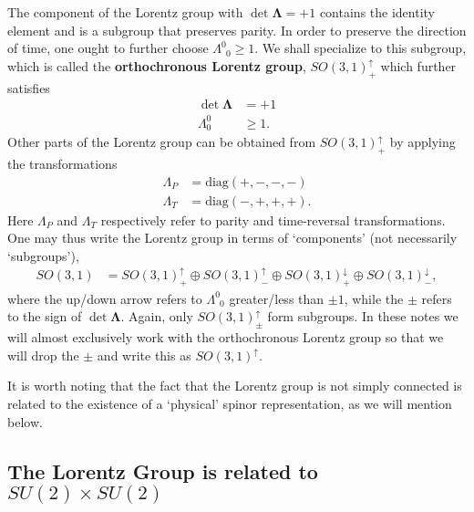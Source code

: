 The component of the Lorentz group with $\det \mathbf\Lambda = +1$ contains the identity element and is a subgroup that preserves parity. In order to preserve the direction of time, one ought to further choose $\Lambda^0_{\phantom{0}0}\geq 1$. We shall specialize to this subgroup, which is called the \textbf{orthochronous Lorentz group}, $SO(3,1)^\uparrow_+$ which further satisfies 
\begin{align}
    \det \mathbf{\Lambda}&= +1\\
    \Lambda^0_0 &\geq 1.
\end{align}
Other parts of the Lorentz group can be obtained from $SO(3,1)^\uparrow_+$ by applying the transformations
\begin{align}
    \Lambda_P &= \text{diag}(+,-,-,-)\\
    \Lambda_T &= \text{diag}(-,+,+,+).
\end{align}
Here $\Lambda_P$ and $\Lambda_T$ respectively refer to parity and time-reversal transformations. One may thus write the Lorentz group in terms of `components' (not necessarily `subgroups'),
\begin{align}
    SO(3,1) &= SO(3,1)^\uparrow_+ \oplus SO(3,1)^\uparrow_- \oplus SO(3,1)^\downarrow_+ \oplus SO(3,1)^\downarrow_-,
\end{align}
where the up/down arrow refers to $\Lambda^0_{\phantom 00}$ greater/less than $\pm 1$, while the $\pm$ refers to the sign of $\det \mathbf\Lambda$. Again, only $SO(3,1)^\uparrow_\pm$ form subgroups. In these notes we will almost exclusively work with the orthochronous Lorentz group so that we will drop the $\pm$ and write this as $SO(3,1)^\uparrow$. 

It is worth noting that the fact that the Lorentz group is not simply connected is related to the existence of a `physical' spinor representation, as we will mention below.


\subsection{\texorpdfstring{The Lorentz Group is related to $SU(2) \times SU(2)$}{The Lorentz Group is related to SU(2)xSU(2)}}


